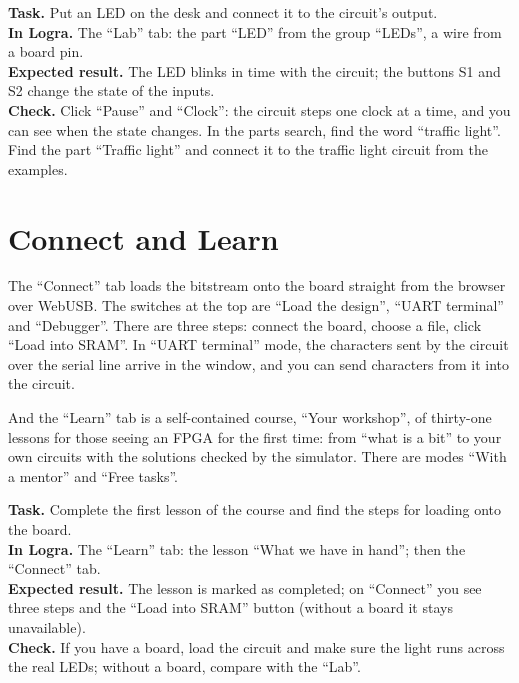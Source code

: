 
\begin{diybox}
\textbf{Task.} Put an LED on the desk and connect it to the circuit's output.\\
\textbf{In Logra.} The ``Lab'' tab: the part ``LED'' from the group
``LEDs'', a wire from a board pin.\\
\textbf{Expected result.} The LED blinks in time with the circuit; the buttons S1 and S2
change the state of the inputs.\\
\textbf{Check.} Click ``Pause'' and ``Clock'': the circuit steps one clock at a time, and
you can see when the state changes. In the parts search, find the word
``traffic light''.\\
 Find the part ``Traffic light'' and connect it to the traffic light circuit from the examples.
\end{diybox}

\section{Connect and Learn}

The ``Connect'' tab loads the bitstream onto the board straight from the browser over
WebUSB. The switches at the top are ``Load the design'', ``UART terminal'' and ``Debugger''.
There are three steps: connect the board, choose a file, click ``Load into SRAM''. In
``UART terminal'' mode, the characters sent by the circuit over the
serial line arrive in the window, and you can send characters from it into the circuit.


And the ``Learn'' tab is a self-contained course, ``Your workshop'', of thirty-one
lessons for those seeing an FPGA for the first time: from ``what is a bit'' to
your own circuits with the solutions checked by the simulator. There are modes ``With a mentor''
and ``Free tasks''.


\begin{diybox}
\textbf{Task.} Complete the first lesson of the course and find the steps for loading onto the board.\\
\textbf{In Logra.} The ``Learn'' tab: the lesson ``What we have in hand''; then the
``Connect'' tab.\\
\textbf{Expected result.} The lesson is marked as completed; on ``Connect''
you see three steps and the ``Load into SRAM'' button (without a board it stays
unavailable).\\
\textbf{Check.} If you have a board, load the circuit and make sure the light
runs across the real LEDs; without a board, compare with the ``Lab''.
\end{diybox}

